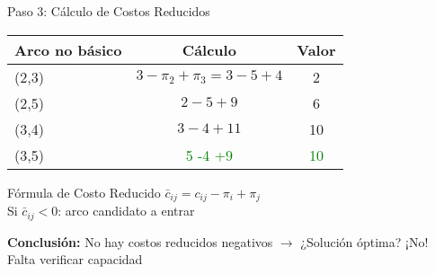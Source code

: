 \documentclass{beamer}
\begin{document}
\begin{frame}{Paso 3: Cálculo de Costos Reducidos}
\begin{tabular}{l|c|c}
Arco no básico & Cálculo & Valor \\ \hline
(2,3) & $3 - \pi_2 + \pi_3 = 3 -5 +4$ & 2 \\
(2,5) & $2 -5 +9$ & 6 \\
(3,4) & $3 -4 +11$ & 10 \\
(3,5) & \textcolor{green}{5 -4 +9} & \textcolor{green}{10} \\
\end{tabular}

\begin{block}{Fórmula de Costo Reducido}
$\bar{c}_{ij} = c_{ij} - \pi_i + \pi_j$ \\
\small
Si $\bar{c}_{ij} < 0$: arco candidato a entrar
\end{block}

\vspace{1em}
\textbf{Conclusión:} No hay costos reducidos negativos $\rightarrow$ ¿Solución óptima? \alert{¡No!} Falta verificar capacidad
\end{frame}
\end{document}
